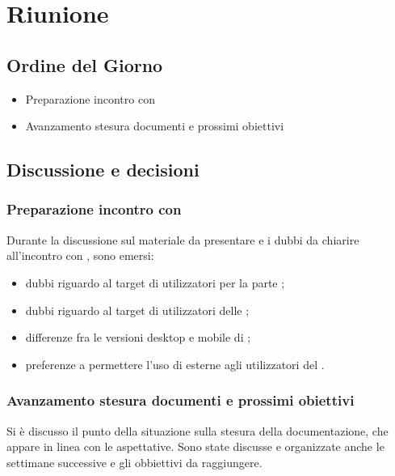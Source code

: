 \section{Riunione}
\subsection{Ordine del Giorno}
\begin{itemize}
	\item Preparazione incontro con \Proponente{}
	\item Avanzamento stesura documenti e prossimi obiettivi
\end{itemize}

\subsection{Discussione e decisioni}
\subsubsection{Preparazione incontro con \Proponente}
Durante la discussione sul materiale da presentare e i dubbi da chiarire all'incontro con \Proponente{}, sono emersi:
\begin{itemize}
	\item dubbi riguardo al target di utilizzatori per la parte ;
	\item dubbi riguardo al target di utilizzatori delle ;
	\item differenze fra le versioni desktop e mobile di ;
	\item preferenze a permettere l'uso di  esterne agli utilizzatori del .
\end{itemize}

\subsubsection{Avanzamento stesura documenti e prossimi obiettivi}
Si è discusso il punto della situazione sulla stesura della documentazione, che appare in linea con le aspettative.
Sono state discusse e organizzate anche le settimane successive e gli obbiettivi da raggiungere.


\clearpage
